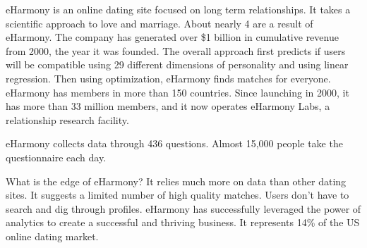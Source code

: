 eHarmony is an online dating site
focused on long term relationships.
It takes a scientific approach to love and marriage.
About nearly 4%
are a result of eHarmony.
The company has generated over \$1 billion
in cumulative revenue from 2000, the year it was founded.
The overall approach first predicts
if users will be compatible using 29 different dimensions
of personality and using linear regression.
Then using optimization, eHarmony finds
matches for everyone.
eHarmony has members in more than 150 countries.
Since launching in 2000, it has more than 33 million members,
and it now operates eHarmony Labs, a relationship research
facility.

eHarmony collects data through 436 questions.
Almost 15,000 people take the questionnaire each day.

What is the edge of eHarmony?
It relies much more on data than other dating sites.
It suggests a limited number of high quality matches.
Users don't have to search and dig through profiles.
eHarmony has successfully leveraged the power
of analytics to create a successful and thriving
business.
It represents 14\% of the US online dating market.